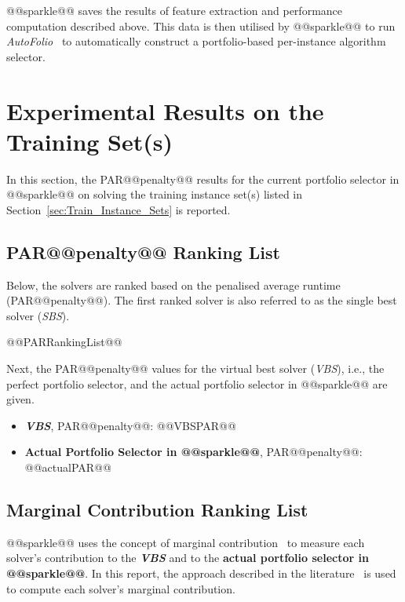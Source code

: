 \documentclass[british]{article}
\begin{document}
@@sparkle@@ saves the results of feature extraction and performance computation described above. This data is then utilised by @@sparkle@@ to run \emph{AutoFolio}~\cite{LinEtAl15} to automatically construct a portfolio-based per-instance algorithm selector.

\section{Experimental Results on the Training Set(s)}
\label{sec:Experimental_Results_Train}

In this section, the PAR@@penalty@@ results for the current portfolio selector in @@sparkle@@ on solving the training instance set(s) listed in Section~\ref{sec:Train_Instance_Sets} is reported.

\subsection{PAR@@penalty@@ Ranking List}
\label{sec:PAR_Ranking}

Below, the solvers are ranked based on the penalised average runtime (PAR@@penalty@@). The first ranked solver is also referred to as the single best solver (\emph{SBS}).

\begin{enumerate}
@@PARRankingList@@
\end{enumerate}

Next, the PAR@@penalty@@ values for the virtual best solver (\emph{VBS}), i.e., the perfect portfolio selector, and the actual portfolio selector in @@sparkle@@ are given.

\begin{itemize}
\item \textbf{\emph{VBS}}, PAR@@penalty@@: @@VBSPAR@@
\item \textbf{Actual Portfolio Selector in @@sparkle@@}, PAR@@penalty@@: @@actualPAR@@
\end{itemize}

\subsection{Marginal Contribution Ranking List}
\label{sec:Marginal_Contribution_Ranking}

@@sparkle@@ uses the concept of marginal contribution~\cite{XuEtAl12} to measure each solver's contribution to the \textbf{\emph{VBS}} and to the \textbf{actual portfolio selector in @@sparkle@@}. In this report, the approach described in the literature~\cite{FreEtAl16} is used to compute each solver's marginal contribution.
\end{document}

